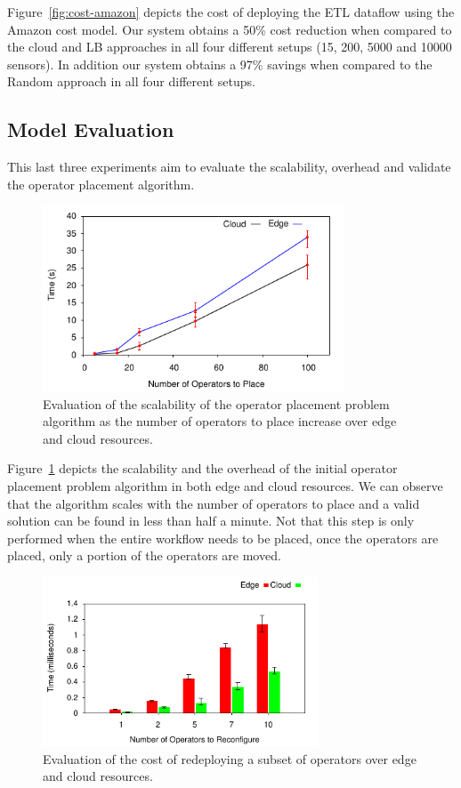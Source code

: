 Figure~\ref{fig:cost-amazon} depicts the cost of deploying the ETL dataflow using the Amazon cost model. Our system obtains a 50\% cost reduction when compared to the cloud and LB approaches in all four different setups (15, 200, 5000 and 10000 sensors). In addition our system obtains a 97\% savings when compared to the Random approach in all four different setups.

\subsection{Model Evaluation}

This last three experiments aim to evaluate the scalability, overhead and validate the operator placement algorithm.

\begin{figure}[h]
  \centering
  \includegraphics[width=0.8\textwidth]{Results/Scale.pdf}
  \caption{Evaluation of the scalability of the operator placement problem algorithm as the number of operators to place increase over edge and cloud resources.}\label{fig:scalefirst}
\end{figure}

Figure~\ref{fig:scalefirst} depicts the scalability and the overhead of the initial operator placement problem algorithm in both edge and cloud resources. We can observe that the algorithm scales with the number of operators to place and a valid solution can be found in less than half a minute. Not that this step is only performed when the entire workflow needs to be placed, once the operators are placed, only a portion of the operators are moved.

\begin{figure}[h]
  \centering
  \includegraphics[width=0.73\textwidth]{Results/Redeploy.pdf}
  \caption{Evaluation of the cost of redeploying a subset of operators over edge and cloud resources.}\label{fig:scalesecond}
\end{figure}

